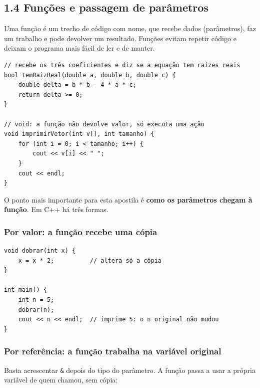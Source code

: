 \subsection{1.4 Funções e passagem de parâmetros}

Uma função é um trecho de código com nome, que recebe dados (parâmetros), faz um trabalho e pode devolver um resultado. Funções evitam repetir código e deixam o programa mais fácil de ler e de manter.

\begin{codigo}
\begin{Verbatim}[breaklines=true, breaksymbolleft={}, fontsize=\footnotesize]
// recebe os três coeficientes e diz se a equação tem raízes reais
bool temRaizReal(double a, double b, double c) {
    double delta = b * b - 4 * a * c;
    return delta >= 0;
}

// void: a função não devolve valor, só executa uma ação
void imprimirVetor(int v[], int tamanho) {
    for (int i = 0; i < tamanho; i++) {
        cout << v[i] << " ";
    }
    cout << endl;
}
\end{Verbatim}
\end{codigo}

O ponto mais importante para esta apostila é \textbf{como os parâmetros chegam à função}. Em C++ há três formas.

\subsubsection{Por valor: a função recebe uma cópia}

\begin{codigo}
\begin{Verbatim}[breaklines=true, breaksymbolleft={}, fontsize=\footnotesize]
void dobrar(int x) {
    x = x * 2;          // altera só a cópia
}

int main() {
    int n = 5;
    dobrar(n);
    cout << n << endl;  // imprime 5: o n original não mudou
}
\end{Verbatim}
\end{codigo}

\subsubsection{Por referência: a função trabalha na variável original}

Basta acrescentar \texttt{\&} depois do tipo do parâmetro. A função passa a usar a própria variável de quem chamou, sem cópia:

